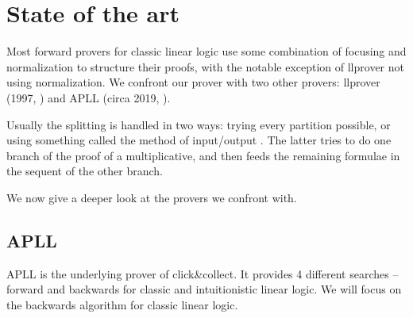 \documentclass[a4paper, 12pt, tesi, english]{report}
\begin{document}



\section{State of the art}
Most forward provers for classic linear logic use some combination of focusing and normalization to structure their proofs, with the notable exception of llprover not using normalization.	%
We confront our prover with two other provers: llprover (1997, %
) and APLL (circa 2019, %
).

Usually the splitting is handled in two ways: trying every partition possible, or using something called the method of input/output %
. The latter tries to do one branch of the proof of a multiplicative, and then feeds the remaining formulae in the sequent of the other branch.

We now give a deeper look at the provers we confront with.

\subsection{APLL}\label{sec:apll}
APLL is the underlying prover of click\&collect. %
It provides 4 different searches -- forward and backwards for classic and intuitionistic linear logic. 
We will focus on the backwards algorithm for classic linear logic.
\end{document}
